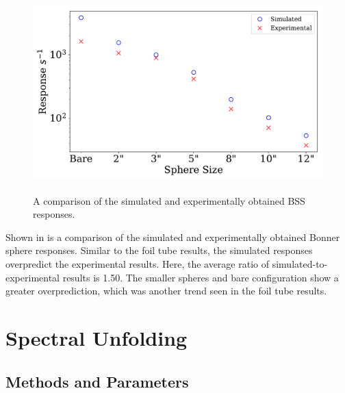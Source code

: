 \begin{figure}[htb]
\centering
\includegraphics[height=3in]{tex/figures/compare_countrates.pdf}
\caption[BSS Responses]{A comparison of the simulated and experimentally obtained BSS responses.}
\label{fig:compare_countrates}
\end{figure}

Shown in  is a comparison of the simulated and experimentally obtained Bonner sphere responses.
Similar to the foil tube results, the simulated responses overpredict the experimental results.
Here, the average ratio of simulated-to-experimental results is 1.50.
The smaller spheres and bare configuration show a greater overprediction, which was another trend seen in the foil tube results.


\section{Spectral Unfolding}

\subsection{Methods and Parameters}

